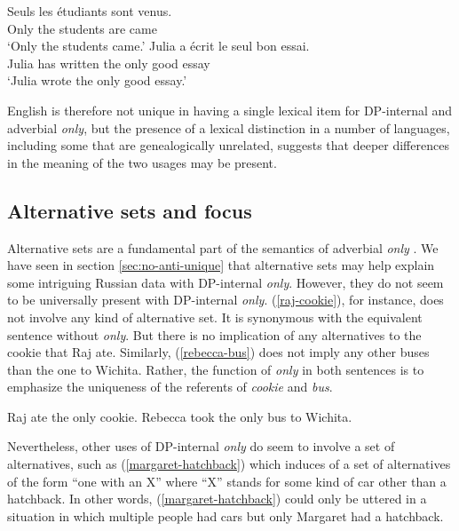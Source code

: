 \begin{exe}
	\ex \gll Seuls les \'{e}tudiants sont venus.\\
	Only the students are came\\
	\glt `Only the students came.'
	\ex \gll Julia a \'{e}crit le seul bon essai.\\
	Julia has written the only good essay\\
	\glt `Julia wrote the only good essay.'
\end{exe}

English is therefore not unique in having a single lexical item for DP-internal and adverbial \textit{only}, but the presence of a lexical distinction in a number of languages, including some that are genealogically unrelated, suggests that deeper differences in the meaning of the two usages may be present.

\subsection{Alternative sets and focus}
Alternative sets are a fundamental part of the semantics of adverbial \textit{only} \citep{rooth85, rooth92}. We have seen in section \ref{sec:no-anti-unique} that alternative sets may help explain some intriguing Russian data with DP-internal \textit{only}. However, they do not seem to be universally present with DP-internal \textit{only}. (\ref{raj-cookie}), for instance, does not involve any kind of alternative set. It is synonymous with the equivalent sentence without \textit{only}. But there is no implication of any alternatives to the cookie that Raj ate. Similarly, (\ref{rebecca-bus}) does not imply any other buses than the one to Wichita. Rather, the function of \textit{only} in both sentences is to emphasize the uniqueness of the referents of \textit{cookie} and \textit{bus}.

\begin{exe}
	\ex \label{raj-cookie} Raj ate the only cookie.
	\ex \label{rebecca-bus} Rebecca took the only bus to Wichita.
\end{exe}

Nevertheless, other uses of DP-internal \textit{only} do seem to involve a set of alternatives, such as (\ref{margaret-hatchback}) which induces of a set of alternatives of the form ``one with an X'' where ``X'' stands for some kind of car other than a hatchback. In other words, (\ref{margaret-hatchback}) could only be uttered in a situation in which multiple people had cars but only Margaret had a hatchback.

